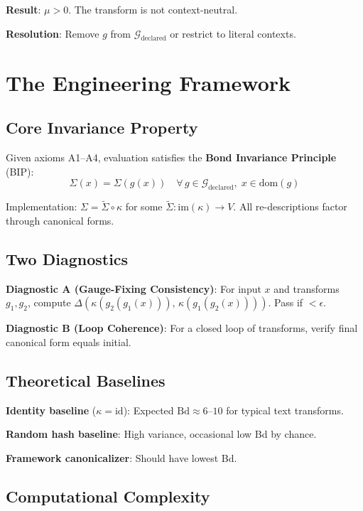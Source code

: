 \documentclass[12pt]{article}
\begin{document}
\textbf{Result}: $\mu > 0$. The transform is not context-neutral.

\textbf{Resolution}: Remove $g$ from $\mathcal{G}_{\mathrm{declared}}$ or restrict to literal contexts.

\section{The Engineering Framework}

\subsection{Core Invariance Property}

Given axioms A1--A4, evaluation satisfies the \textbf{Bond Invariance Principle} (BIP):
\[
\Sigma(x) = \Sigma(g(x)) \quad \forall\, g \in \mathcal{G}_{\mathrm{declared}},\; x \in \mathrm{dom}(g)
\]

Implementation: $\Sigma = \tilde{\Sigma} \circ \kappa$ for some $\tilde{\Sigma}\colon \mathrm{im}(\kappa) \to V$. All re-descriptions factor through canonical forms.

\subsection{Two Diagnostics}

\textbf{Diagnostic A (Gauge-Fixing Consistency)}: For input $x$ and transforms $g_1, g_2$, compute $\Delta(\kappa(g_2(g_1(x))),\, \kappa(g_1(g_2(x))))$. Pass if $< \epsilon$.

\textbf{Diagnostic B (Loop Coherence)}: For a closed loop of transforms, verify final canonical form equals initial.

\subsection{Theoretical Baselines}

\textbf{Identity baseline} ($\kappa = \mathrm{id}$): Expected $\mathrm{Bd} \approx 6$--$10$ for typical text transforms.

\textbf{Random hash baseline}: High variance, occasional low Bd by chance.

\textbf{Framework canonicalizer}: Should have lowest Bd.

\subsection{Computational Complexity}
\end{document}

